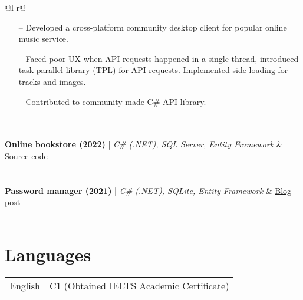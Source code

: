 \documentclass[a4paper,12pt]{article}
\begin{document}
\begin{tabularx}{\linewidth}{ @{}l r@{} }
{\begin{minipage}[t]{\linewidth}
    \begin{itemize}[nosep,after=\strut, leftmargin=1em, itemsep=3pt]
        \item[--] Developed a cross-platform community desktop client for popular online music service.
        \item [--] Faced poor UX when API requests happened in a single thread, introduced task parallel library (TPL) for API requests. Implemented side-loading for tracks and images.
        \item [--] Contributed to community-made C\# API library.
    \end{itemize}
    \end{minipage}
}  \\
\\
\textbf{Online bookstore (2022)} | \emph{C\# (.NET), SQL Server, Entity Framework} & \hfill \href{https://github.com/andude10/The-Tome/}{Source code} \\[3.75pt]
  \\
\\
\textbf{Password manager (2021)} | \emph{C\# (.NET), SQLite, Entity Framework} & \hfill \href{https://andude10.github.io/projects/SecurePass/}{Blog post} \\[3.75pt]
  \\
\end{tabularx}

\section{Languages}

\begin{tabularx}{\linewidth}{@{}l X@{}}
English  &  \normalsize{C1 (Obtained IELTS Academic Certificate)}\\
\end{tabularx}

\vfill
{}
\end{document}
